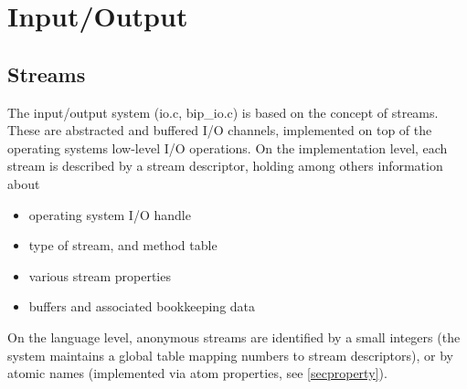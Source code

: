 %
% 
% 
% 
% 

\section{Input/Output}

\subsection{Streams}

The {\eclipse} input/output system (io.c, bip_io.c) is based on the
concept of streams.  These are abstracted and buffered I/O channels,
implemented on top of the operating systems low-level I/O operations.
On the implementation level, each stream is described by a stream
descriptor, holding among others information about
\begin{itemize}
\item operating system I/O handle
\item type of stream, and method table
\item various stream properties
\item buffers and associated bookkeeping data
\end{itemize}
On the {\eclipse} language level, anonymous streams are identified by
a small integers (the system maintains a global table mapping numbers
to stream descriptors), or by atomic names (implemented via atom
properties, see \ref{secproperty}).

